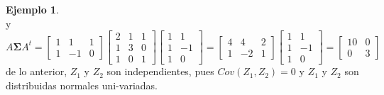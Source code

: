\documentclass[
]{book}
\theoremstyle{definition}
\theoremstyle{definition}
\newtheorem{example}{Ejemplo}[chapter]
\theoremstyle{definition}
\theoremstyle{definition}
\theoremstyle{remark}
\begin{document}
\begin{example}
\[\]
y
\[
A\mathbf{\Sigma} A^t= \begin{bmatrix}
1 & 1 &1 \\ 1 & -1 & 0
\end{bmatrix}\begin{bmatrix}
2 & 1 &1 \\
1 & 3 & 0 \\
1 & 0 & 1
\end{bmatrix}\begin{bmatrix}
1 & 1\\
1 & -1 \\
1 & 0
\end{bmatrix}=\begin{bmatrix}
4 & 4 &2 \\
1 & -2 & 1
\end{bmatrix}\begin{bmatrix}
1 & 1\\
1 & -1 \\
1 & 0
\end{bmatrix}=\begin{bmatrix}
10 & 0\\
0 & 3 
\end{bmatrix}
\]
de lo anterior, \(Z_1\) y \(Z_2\) son independientes, pues \(Cov(Z_1,Z_2)=0\) y \(Z_1\) y \(Z_2\) son distribuidas normales uni-variadas.
\end{example}
\end{document}
